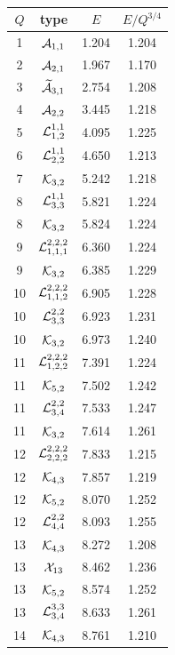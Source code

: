 \documentclass[12pt]{article}
\begin{document}
\begin{table}
\vskip -26.7cm \ \hskip 10cm
\begin{tabular}{|c|c|c|c|}
\hline $Q$ &  type & $E$ & $E/Q^{3/4}$\\  \hline 1 & ${\cal
A}_{1,1}$ &  1.204 &  1.204\\ \hline 2 & ${\cal A}_{2,1}$ &  1.967 &
1.170\\ \hline 3 & $\widetilde{\cal A}_{3,1}$ &  2.754 &  1.208\\
\hline 4 & ${\cal A}_{2,2}$ &  3.445 & 1.218 \\ \hline 5 & ${\cal
L}_{1,2}^{1,1}$ &  4.095 & 1.225 \\ \hline 6 & ${\cal
L}_{2,2}^{1,1}$ & 4.650  & 1.213 \\ \hline 7 & ${\cal K}_{3,2}$ &
5.242  & 1.218 \\ \hline
8 & ${\cal L}_{3,3}^{1,1}$ & 5.821  & 1.224 \\
8 & ${\cal K}_{3,2}$ &5.824  & 1.224 \\ \hline
9  & ${\cal L}_{1,1,1}^{2,2,2}$ &  6.360 & 1.224 \\
9  & ${\cal K}_{3,2}$ & 6.385 &  1.229 \\ \hline
10  & ${\cal L}_{1,1,2}^{2,2,2}$ &  6.905 & 1.228 \\
10  & ${\cal L}_{3,3}^{2,2}$ & 6.923  &  1.231 \\
10  & ${\cal K}_{3,2}$ &  6.973  &  1.240 \\ \hline
11  & ${\cal L}_{1,2,2}^{2,2,2}$ & 7.391 &  1.224 \\
11  & ${\cal K}_{5,2}$ &  7.502 & 1.242  \\
11  & ${\cal L}_{3,4}^{2,2}$ &  7.533 &  1.247 \\
11  & ${\cal K}_{3,2}$ &  7.614  &  1.261 \\ \hline
12  & ${\cal L}_{2,2,2}^{2,2,2}$ &7.833   &  1.215  \\
12  & ${\cal K}_{4,3}$ & 7.857 &  1.219   \\
12  & ${\cal K}_{5,2}$ & 8.070 &  1.252  \\
12  & ${\cal L}_{4,4}^{2,2}$ & 8.093 &   1.255 \\ \hline
13  & ${\cal K}_{4,3}$ & 8.272 &1.208  \\
13  & ${\cal X}_{13}$ & 8.462 &1.236  \\
13  & ${\cal K}_{5,2}$ &8.574  & 1.252 \\
13  & ${\cal L}_{3,4}^{3,3}$ & 8.633  &  1.261 \\  \hline
14  & ${\cal K}_{4,3}$ & 8.761  & 1.210  \\

\end{tabular}
\end{table}
\end{document}

